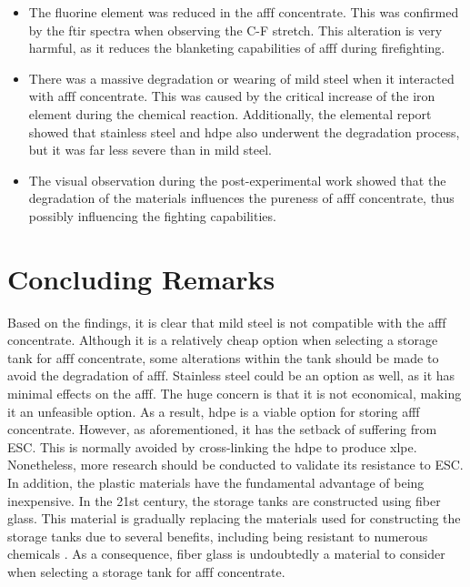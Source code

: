 \begin{itemize}
    \item The fluorine element was reduced in the \acrshort{afff} concentrate. This was confirmed by the \acrshort{ftir} spectra when observing the C-F stretch. This alteration is very harmful, as it reduces the blanketing capabilities of \acrshort{afff} during firefighting.
    \item There was a massive degradation or wearing of mild steel when it interacted with \acrshort{afff} concentrate. This was caused by the critical increase of the iron element during the chemical reaction. Additionally, the elemental report showed that stainless steel and \acrshort{hdpe} also underwent the degradation process, but it was far less severe than in mild steel.
    \item The visual observation during the post-experimental work showed that the degradation of the materials influences the pureness of \acrshort{afff} concentrate, thus possibly influencing the fighting capabilities.
\end{itemize}

\section{Concluding Remarks}
Based on the findings, it is clear that mild steel is not compatible with the \acrshort{afff} concentrate. Although it is a relatively cheap option when selecting a storage tank for \acrshort{afff} concentrate, some alterations within the tank should be made to avoid the degradation of \acrshort{afff}. Stainless steel could be an option as well, as it has minimal effects on the \acrshort{afff}. The huge concern is that it is not economical, making it an unfeasible option. As a result, \acrshort{hdpe} is a viable option for storing \acrshort{afff} concentrate. However, as aforementioned, it has the setback of suffering from ESC. This is normally avoided by cross-linking the \acrshort{hdpe} to produce \acrfull{xlpe}. Nonetheless, more research should be conducted to validate its resistance to ESC. In addition, the plastic materials have the fundamental advantage of being inexpensive.
In the 21st century, the storage tanks are constructed using fiber glass. This material is gradually replacing the materials used for constructing the storage tanks due to several benefits, including being resistant to numerous chemicals \cite{avdeeva2016chemical}. As a consequence, fiber glass is undoubtedly a material to consider when selecting a storage tank for \acrshort{afff} concentrate.

